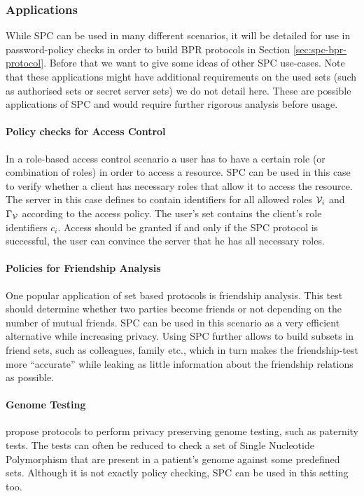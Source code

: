 \subsubsection{Applications}\label{sec:generalisation}
While \ac{SPC} can be used in many different scenarios, it will be detailed for use in password-policy checks in order to build \ac{BPR} protocols in Section \ref{sec:spc-bpr-protocol}.
Before that we want to give some ideas of other \ac{SPC} use-cases.
Note that these applications might have additional requirements on the used sets (such as authorised sets or secret server sets) we do not detail here.
These are possible applications of \ac{SPC} and would require further rigorous analysis before usage.

\paragraph{Policy checks for Access Control}
In a role-based access control scenario \cite{FerraioloK09} a user has to have a certain role (or combination of roles) in order to access a resource.
\ac{SPC} can be used in this case to verify whether a client has necessary roles that allow it to access the resource.
The server in this case defines \ServerSet to contain identifiers for all allowed roles $\mathcal{V}_i$ and $\Gamma_\mathcal{V}$ according to the access policy.
The user's set \ClientSet contains the client's role identifiers $c_i$.
Access should be granted if and only if the \ac{SPC} protocol is successful, \ie the user can convince the server that he has all necessary roles.

\paragraph{Policies for Friendship Analysis}
One popular application of set based protocols is friendship analysis.
This test should determine whether two parties become friends or not depending on the number of mutual friends.
\ac{SPC} can be used in this scenario as a very efficient alternative while increasing privacy.
Using \ac{SPC} further allows to build subsets in friend sets, such as colleagues, family etc., which in turn makes the friendship-test more ``accurate'' while leaking as little information about the friendship relations as possible.

\paragraph{Genome Testing}
\citet{BaldiBCGT11} propose protocols to perform privacy preserving genome testing, such as paternity tests. 
The tests can often be reduced to check a set of Single Nucleotide Polymorphism that are present in a patient's genome against some predefined sets. 
Although it is not exactly policy checking, \ac{SPC} can be used in this setting too. 


